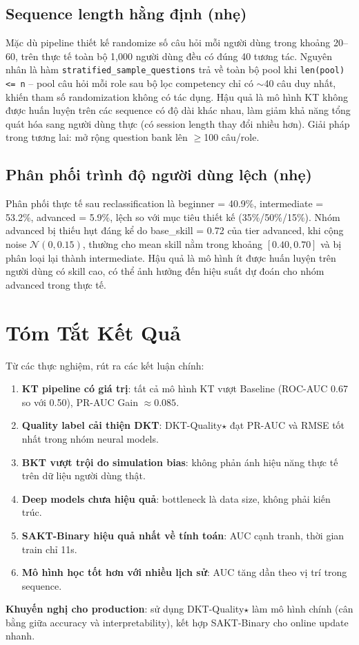 \subsection{Sequence length hằng định (nhẹ)}
Mặc dù pipeline thiết kế randomize số câu hỏi mỗi người dùng trong khoảng 20--60, trên thực tế toàn bộ 1{,}000 người dùng đều có đúng 40 tương tác. Nguyên nhân là hàm \texttt{stratified\_sample\_questions} trả về toàn bộ pool khi \texttt{len(pool) <= n} -- pool câu hỏi mỗi role sau bộ lọc competency chỉ có $\sim$40 câu duy nhất, khiến tham số randomization không có tác dụng. Hậu quả là mô hình KT không được huấn luyện trên các sequence có độ dài khác nhau, làm giảm khả năng tổng quát hóa sang người dùng thực (có session length thay đổi nhiều hơn). Giải pháp trong tương lai: mở rộng question bank lên $\geq$100 câu/role.

\subsection{Phân phối trình độ người dùng lệch (nhẹ)}
Phân phối thực tế sau reclassification là beginner = 40.9\%, intermediate = 53.2\%, advanced = 5.9\%, lệch so với mục tiêu thiết kế (35\%/50\%/15\%). Nhóm advanced bị thiếu hụt đáng kể do base\_skill = 0.72 của tier advanced, khi cộng noise $\mathcal{N}(0, 0.15)$, thường cho mean skill nằm trong khoảng $[0.40, 0.70]$ và bị phân loại lại thành intermediate. Hậu quả là mô hình ít được huấn luyện trên người dùng có skill cao, có thể ảnh hưởng đến hiệu suất dự đoán cho nhóm advanced trong thực tế.

\section{Tóm Tắt Kết Quả}
\label{sec:summary}

Từ các thực nghiệm, rút ra các kết luận chính:

\begin{enumerate}
  \item \textbf{KT pipeline có giá trị}: tất cả mô hình KT vượt Baseline (ROC-AUC 0.67 so với 0.50), PR-AUC Gain $\approx 0.085$.
  \item \textbf{Quality label cải thiện DKT}: DKT-Quality$\star$ đạt PR-AUC và RMSE tốt nhất trong nhóm neural models.
  \item \textbf{BKT vượt trội do simulation bias}: không phản ánh hiệu năng thực tế trên dữ liệu người dùng thật.
  \item \textbf{Deep models chưa hiệu quả}: bottleneck là data size, không phải kiến trúc.
  \item \textbf{SAKT-Binary hiệu quả nhất về tính toán}: AUC cạnh tranh, thời gian train chỉ 11s.
  \item \textbf{Mô hình học tốt hơn với nhiều lịch sử}: AUC tăng dần theo vị trí trong sequence.
\end{enumerate}

\textbf{Khuyến nghị cho production}: sử dụng DKT-Quality$\star$ làm mô hình chính (cân bằng giữa accuracy và interpretability), kết hợp SAKT-Binary cho online update nhanh.
